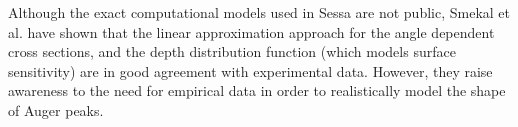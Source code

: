 Although the exact computational models used in Sessa are not public, Smekal et al. have shown that the linear approximation approach for the angle dependent cross sections, and the depth distribution function (which models surface sensitivity) are in good agreement with experimental data. However, they raise awareness to the need for empirical data in order to realistically model the shape of Auger peaks.